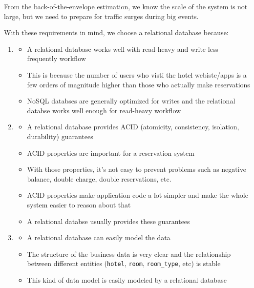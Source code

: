 \documentclass{report}
\theoremstyle{definition}
\begin{document}
From the back-of-the-envelope estimation, we know the scale of the system is not large, but we need to prepare for traffic surges during big events.

With these requirements in mind, we choose a relational database because:

\begin{enumerate}
\item

\begin{itemize}
\item
A relational database works well with read-heavy and write less frequently workflow
\item
This is because the number of users who visti the hotel webiste/apps is a few orders of magnitude higher than those who actually make reservations
\item
NoSQL databses are generally optimized for writes and the relational databse works well enough for read-heavy workflow
\end{itemize}

\item

\begin{itemize}
\item
A relational database provides ACID (atomicity, consistency, isolation, durability) guarantees
\item
ACID properties are important for a reservation system
\item
With those properties, it's not easy to prevent problems such as negative balance, double charge, double reservations, etc.
\item
ACID properties make application code a lot simpler and make the whole system easier to reason about that
\item
A relational databse usually provides these guarantees
\end{itemize}

\item

\begin{itemize}
\item
A relational database can easily model the data
\item
The structure of the business data is very clear and the relationship between different entities (\lstinline|hotel|, \lstinline|room|, \lstinline|room_type|, etc) is stable
\item
This kind of data model is easily modeled by a relational database
\end{itemize}
\end{enumerate}
\end{document}
